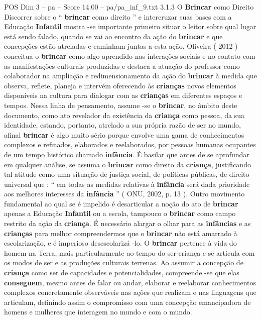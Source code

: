 \begin{textsample}{POS Dim 3 – pa – Score 14.00 – pa/pa\_inf\_9.txt}  \label{ex:f3_pos_240}
3.1.3 O \textbf{Brincar} como Direito Discorrer sobre o “ \textbf{brincar} como direito ” e intercruzar suas bases com a Educação \textbf{Infantil} mostra -se importante primeiro situar o leitor sobre qual lugar está sendo falado, quando se vai ao encontro da ação do \textbf{brincar} e que concepções estão atreladas e caminham juntas a esta ação.
Oliveira ( 2012 ) conceitua o \textbf{brincar} como algo aprendido nas interações sociais e no contato com as manifestações culturais produzidas e destaca a atuação do professor como colaborador na ampliação e redimensionamento da ação do \textbf{brincar} à medida que observa, reflete, planeja e intervém oferecendo às \textbf{crianças} novos elementos disponíveis na cultura para dialogar com as \textbf{crianças} em diferentes espaços e tempos.
Nessa linha de pensamento, assume -se o \textbf{brincar}, no âmbito deste documento, como ato revelador da existência da \textbf{criança} como pessoa, da sua identidade, estando, portanto, atrelado a sua própria razão de ser no mundo, afinal \textbf{brincar} é algo muito sério porque envolve uma gama de conhecimentos complexos e refinados, elaborados e reelaborados, por pessoas humanas ocupantes de um tempo histórico chamado \textbf{infância}.
É basilar que antes de se aprofundar em qualquer análise, se assuma o \textbf{brincar} como direito da \textbf{criança}, justificando tal atitude como uma situação de justiça social, de políticas públicas, de direito universal que : “ em todas as medidas relativas à \textbf{infância} será dada prioridade aos melhores interesses da \textbf{infância} ” ( ONU, 2002, p. 13 ).
Outro movimento fundamental ao qual se é impelido é desarticular a noção do ato de \textbf{brincar} apenas a Educação \textbf{Infantil} ou a escola, tampouco o \textbf{brincar} como campo restrito da ação da \textbf{criança}.
É necessário alargar o olhar para as \textbf{infâncias} e as \textbf{crianças} para melhor compreendermos que o \textbf{brincar} não está amarrado à escolarização, e é imperioso desescolarizá -lo.
O \textbf{brincar} pertence à vida do homem na Terra, mais particularmente ao tempo do ser-criança e se articula com os modos de ser e as produções culturais terrenas.
Ao assumir a concepção de \textbf{criança} como ser de capacidades e potencialidades, compreende -se que elas \textbf{conseguem}, mesmo antes de falar ou andar, elaborar e reelaborar conhecimentos complexos concretamente observáveis nas ações que realizam e nas linguagens que articulam, definindo assim o compromisso com uma concepção emancipadora de homens e mulheres que interagem no mundo e com o mundo.

\end{textsample}

